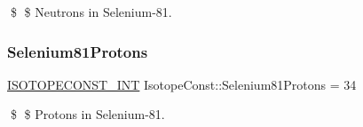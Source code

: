 \$ \$ Neutrons in Selenium-\/81. \mbox{\label{group___isotope_const-_selenium-_se81_gac7a095cc9a2a6d03155a55fde47aa235}} 
\subsubsection{\texorpdfstring{Selenium81\+Protons}{Selenium81Protons}}
{\footnotesize\ttfamily \mbox{\hyperlink{group___isotope_const-_macros_ga5f18360b3e99483a35c32d789e62621c}{I\+S\+O\+T\+O\+P\+E\+C\+O\+N\+S\+T\+\_\+\+I\+NT}} Isotope\+Const\+::\+Selenium81\+Protons = 34}

\$ \$ Protons in Selenium-\/81. 